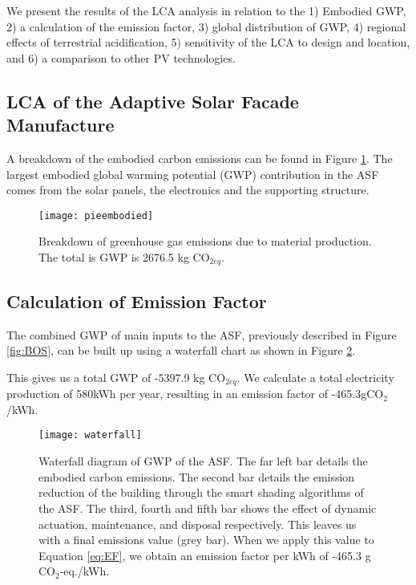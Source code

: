 
We present the results of the LCA analysis in relation to the 1) Embodied GWP, 2) a calculation of the emission factor, 3) global distribution of GWP, 4) regional effects of terrestrial acidification, 5) sensitivity of the LCA to design and location, and 6) a comparison to other PV technologies.

\subsection{LCA of the Adaptive Solar Facade Manufacture}

A breakdown of the embodied carbon emissions can be found in Figure  \ref{fig:embodied}. The largest embodied global warming potential (GWP) contribution in the ASF comes from the solar panels, the electronics and the supporting structure.

\begin{figure}[H]
\begin{center}
\texttt{[image: pieembodied]}
\caption{Breakdown of greenhouse gas emissions due to material production. The total is GWP is 2676.5 kg CO$_{2eq}$.}
\label{fig:embodied}
\end{center}
\end{figure}

\subsection{Calculation of Emission Factor}
The combined GWP of main inputs to the ASF, previously described in Figure \ref{fig:BOS}, can be built up using a waterfall chart as shown in Figure \ref{fig:waterfall}. 

This gives us a total GWP of -5397.9 kg CO$_{2eq}$. We calculate a total electricity production of 580kWh per year, resulting in an emission factor of -465.3gCO${_2}$/kWh.

\begin{figure}[H]
\begin{center}
\texttt{[image: waterfall]}
\caption{Waterfall diagram of GWP of the ASF. The far left bar details the embodied carbon emissions. The second bar details the emission reduction of the building through the smart shading algorithms of the ASF. The third, fourth and fifth bar shows the effect of dynamic actuation, maintenance, and disposal respectively. This leaves us with a final emissions value (grey bar). When we apply this value to Equation \ref{eq:EF}, we obtain an emission factor per kWh of -465.3 g CO$_2$-eq./kWh.}

\label{fig:waterfall}
\end{center}
\end{figure}

